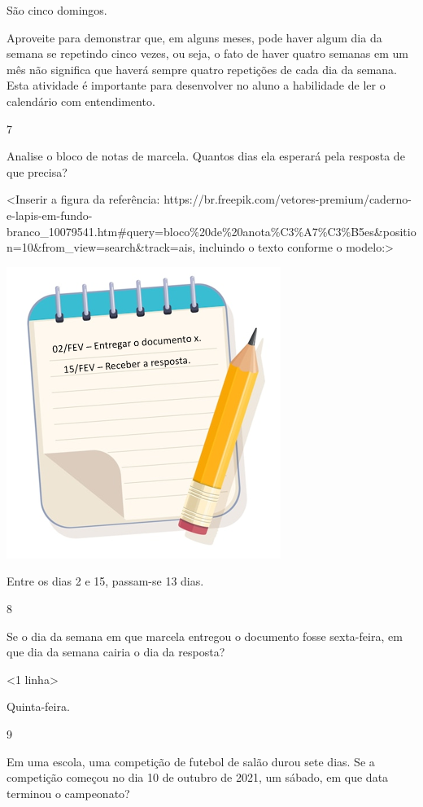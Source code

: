São cinco domingos.

Aproveite para demonstrar que, em alguns meses,
pode haver algum dia da semana se repetindo cinco vezes, ou seja, o fato de
haver quatro semanas em um mês não significa que haverá sempre quatro repetições
de cada dia da semana. Esta atividade é importante para desenvolver no
aluno a habilidade de ler o calendário com entendimento.

\num{7}

Analise o bloco de notas de marcela. Quantos dias ela esperará
pela resposta de que precisa?

\textless{}Inserir a figura da referência:
https://br.freepik.com/vetores-premium/caderno-e-lapis-em-fundo-branco\_10079541.htm\#query=bloco\%20de\%20anota\%C3\%A7\%C3\%B5es\&position=10\&from\_view=search\&track=ais,
incluindo o texto conforme o modelo:\textgreater{}

\includegraphics[width=3.51091in,height=3.72969in]{media/image37.png}

Entre os dias 2 e 15, passam-se 13 dias.

\num{8}

Se o dia da semana em que marcela entregou o documento fosse
sexta-feira, em que dia da semana cairia o dia da resposta?

\textless{}1 linha\textgreater{}

Quinta-feira.

\num{9}

Em uma escola, uma competição de futebol de salão durou sete dias.
Se a competição começou no dia 10 de outubro de 2021, um sábado, em que
data terminou o campeonato?

